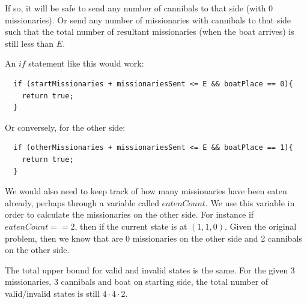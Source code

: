 \documentclass[a4paper]{report}
\begin{document}
If so, it will be safe to send any number of cannibals to that side (with 0 missionaries). Or send any number of missionaries
with cannibals to that side such that the total number of resultant missionaries (when the boat arrives) is still less than
$E$.

An $if$ statement like this would work: 

\begin{lstlisting}
  if (startMissionaries + missionariesSent <= E && boatPlace == 0){
    return true;
  }
\end{lstlisting}

Or conversely, for the other side:

\begin{lstlisting}
  if (otherMissionaries + missionariesSent <= E && boatPlace == 1){
    return true;
  }
\end{lstlisting}

We would also need to keep track of how many missionaries have been eaten already, perhaps through a variable
called $eatenCount$. We use this variable in order to calculate the missionaries on the other side. For instance if
$eatenCount == 2$, then if the current state is at $(1,1,0)$. Given the original problem, then we know that are 0
missionaries on the other side and 2 cannibals on the other side. 


The total upper bound for valid and invalid states is the same. For the given 3 missionaries, 3
cannibals and boat on starting side, the total number of valid/invalid states is still $4 \cdot 4 \cdot 2$.
\end{document}
